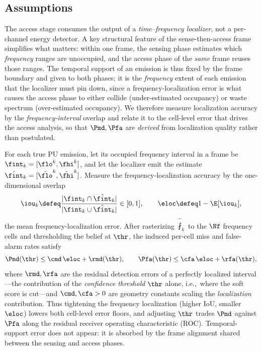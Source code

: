 \subsection{Assumptions}
\label{subsec:assumptions}

The access stage consumes the output of a \emph{time--frequency localizer},
not a per-channel energy detector. A key structural feature of the
sense-then-access frame simplifies what matters: within one frame, the
sensing phase estimates which \emph{frequency} ranges are unoccupied, and the
access phase of the \emph{same} frame reuses those ranges. The temporal
support of an emission is thus fixed by the frame boundary and given to both
phases; it is the \emph{frequency} extent of each emission that the localizer
must pin down, since a frequency-localization error is what causes the access
phase to either collide (under-estimated occupancy) or waste spectrum
(over-estimated occupancy). We therefore measure localization accuracy by the
\emph{frequency-interval} overlap and relate it to the cell-level error that
drives the access analysis, so that $\Pmd,\Pfa$ are \emph{derived} from
localization quality rather than postulated.

\begin{assumption}
\label{as:localization}
For each true PU emission, let its occupied frequency interval in a frame be
$\fint_k=[\flo^{k},\fhi^{k}]$, and let the localizer emit the estimate
$\hat\fint_k=[\hat\flo^{k},\hat\fhi^{k}]$. Measure the frequency-localization
accuracy by the one-dimensional overlap
\begin{equation}
\iou_k\defeq\frac{|\fint_k\cap\hat\fint_k|}{|\fint_k\cup\hat\fint_k|}\in[0,1],
\qquad
\eloc\defeq 1-\E[\iou_k],
\label{eq:freq_iou}
\end{equation}
the mean frequency-localization error. After rasterizing $\hat\fint_k$ to the
$\Nf$ frequency cells and thresholding the belief at $\thr$, the induced
per-cell miss and false-alarm rates satisfy
\begin{equation}
\Pmd(\thr)\le \cmd\,\eloc + \rmd(\thr),
\qquad
\Pfa(\thr)\le \cfa\,\eloc + \rfa(\thr),
\label{eq:loc_to_cell}
\end{equation}
where $\rmd,\rfa$ are the residual detection errors of a perfectly localized
interval---the contribution of the \emph{confidence threshold} $\thr$ alone,
i.e.,\ where the soft score is cut---and $\cmd,\cfa>0$ are geometry
constants scaling the \emph{localization} contribution. Thus tightening the
frequency localization (higher IoU, smaller $\eloc$) lowers both cell-level
error floors, and adjusting $\thr$ trades $\Pmd$ against $\Pfa$ along the
residual receiver operating characteristic (ROC). Temporal-support error does
not appear: it is absorbed by the
frame alignment shared between the sensing and access phases.
\end{assumption}

